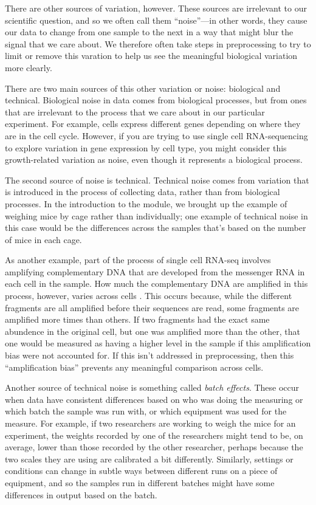 \documentclass[]{tufte-book}
\begin{document}
There are other sources of variation, however. These sources are irrelevant to
our scientific question, and so we often call them ``noise''---in other words,
they cause our data to change from one sample to the next in a way that might
blur the signal that we care about. We therefore often take steps in
preprocessing to try to limit or remove this varation to help us see the
meaningful biological variation more clearly.

There are two main sources of this other variation or noise: biological and
technical. Biological noise in data comes from biological processes, but from
ones that are irrelevant to the process that we care about in our particular
experiment. For example, cells express different genes depending on where they
are in the cell cycle. However, if you are trying to use single cell
RNA-sequencing to explore variation in gene expression by cell type, you might
consider this growth-related variation as noise, even though it represents a
biological process.

The second source of noise is technical. Technical noise comes from variation
that is introduced in the process of collecting data, rather than from
biological processes. In the introduction to the module, we brought up the
example of weighing mice by cage rather than individually; one example of
technical noise in this case would be the differences across the samples that's
based on the number of mice in each cage.

As another example, part of the process of single cell RNA-seq involves
amplifying complementary DNA that are developed from the messenger RNA in each
cell in the sample. How much the complementary DNA are amplified in this
process, however, varies across cells \citep{perkel2017single}. This occurs because,
while the different fragments are all amplified before their sequences are read,
some fragments are amplified more times than others. If two fragments had the
exact same abundence in the original cell, but one was amplified more than the
other, that one would be measured as having a higher level in the sample if this
amplification bias were not accounted for. If this isn't addressed in
preprocessing, then this ``amplification bias'' prevents any meaningful comparison
across cells.

Another source of technical noise is something called \emph{batch effects}. These
occur when data have consistent differences based on who was doing the measuring
or which batch the sample was run with, or which equipment was used for the
measure. For example, if two researchers are
working to weigh the mice for an experiment, the weights recorded by one of the
researchers might tend to be, on average, lower than those recorded by the other
researcher, perhaps because the two scales they are using are calibrated a bit
differently. Similarly, settings or conditions can change in subtle ways between
different runs on a piece of equipment, and so the samples run in different
batches might have some differences in output based on the batch.
\end{document}
